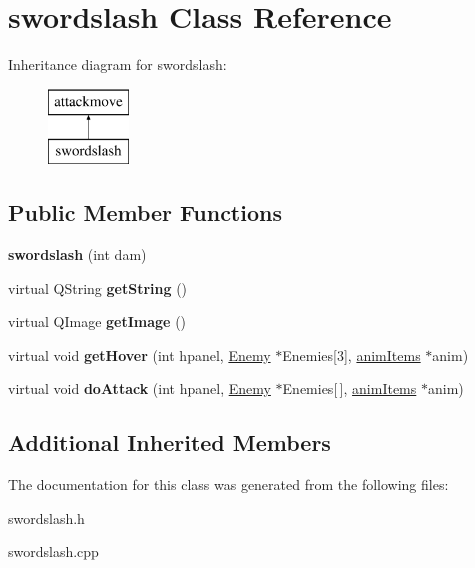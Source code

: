 \hypertarget{classswordslash}{\section{swordslash Class Reference}
\label{classswordslash}
}
Inheritance diagram for swordslash\-:\begin{figure}[H]
\begin{center}
\leavevmode
\includegraphics[height=2.000000cm]{classswordslash}
\end{center}
\end{figure}
\subsection*{Public Member Functions}
\begin{DoxyCompactItemize}
\item 
\hypertarget{classswordslash_a1c4547e783632e2e3e42642754dfb6ea}{{\bfseries swordslash} (int dam)}\label{classswordslash_a1c4547e783632e2e3e42642754dfb6ea}

\item 
\hypertarget{classswordslash_ac58a7e3b969bb957548c55bdfd6a0b05}{virtual Q\-String {\bfseries get\-String} ()}\label{classswordslash_ac58a7e3b969bb957548c55bdfd6a0b05}

\item 
\hypertarget{classswordslash_a25cbfa2df6b5718a299eed09cf716822}{virtual Q\-Image {\bfseries get\-Image} ()}\label{classswordslash_a25cbfa2df6b5718a299eed09cf716822}

\item 
\hypertarget{classswordslash_af40c617c0463f788bda02fe5e8109511}{virtual void {\bfseries get\-Hover} (int hpanel, \hyperlink{class_enemy}{Enemy} $\ast$Enemies\mbox{[}3\mbox{]}, \hyperlink{classanim_items}{anim\-Items} $\ast$anim)}\label{classswordslash_af40c617c0463f788bda02fe5e8109511}

\item 
\hypertarget{classswordslash_a8583edccf2f8b5635797e6891f797211}{virtual void {\bfseries do\-Attack} (int hpanel, \hyperlink{class_enemy}{Enemy} $\ast$Enemies\mbox{[}$\,$\mbox{]}, \hyperlink{classanim_items}{anim\-Items} $\ast$anim)}\label{classswordslash_a8583edccf2f8b5635797e6891f797211}

\end{DoxyCompactItemize}
\subsection*{Additional Inherited Members}


The documentation for this class was generated from the following files\-:\begin{DoxyCompactItemize}
\item 
swordslash.\-h\item 
swordslash.\-cpp\end{DoxyCompactItemize}
